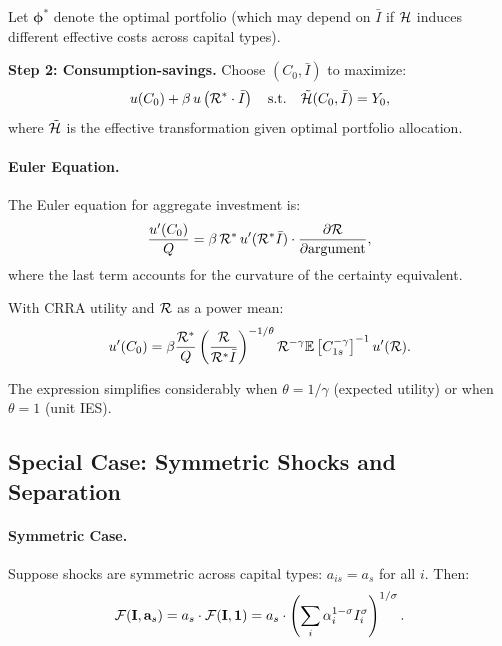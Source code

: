 Let $\boldsymbol{\phi}^*$ denote the optimal portfolio (which may depend on $\bar{I}$ if $\mathcal{H}$ induces different effective costs across capital types).

\medskip
\noindent
\textbf{Step 2: Consumption-savings.} Choose $(C_0, \bar{I})$ to maximize:
\begin{equation}
u(C_0) + \beta \, u\left( \mathcal{R}^* \cdot \bar{I} \right) \quad \text{s.t.} \quad \tilde{\mathcal{H}}(C_0, \bar{I}) = Y_0,
\label{eq:ac-risk-step2}
\end{equation}
where $\tilde{\mathcal{H}}$ is the effective transformation given optimal portfolio allocation.

\paragraph{Euler Equation.}
The Euler equation for aggregate investment is:
\begin{equation}
\frac{u'(C_0)}{Q} = \beta \, \mathcal{R}^* \, u'(\mathcal{R}^* \bar{I}) \cdot \frac{\partial \mathcal{R}}{\partial \text{argument}},
\label{eq:ac-risk-euler-full}
\end{equation}
where the last term accounts for the curvature of the certainty equivalent.

With CRRA utility and $\mathcal{R}$ as a power mean:
\begin{equation}
u'(C_0) = \beta \frac{\mathcal{R}^*}{Q} \left( \frac{\mathcal{R}}{\mathcal{R}^* \bar{I}} \right)^{-1/\theta} \mathcal{R}^{-\gamma} \mathbb{E}\left[ C_{1s}^{-\gamma} \right]^{-1} u'(\mathcal{R}).
\label{eq:ac-risk-euler-crra}
\end{equation}

The expression simplifies considerably when $\theta = 1/\gamma$ (expected utility) or when $\theta = 1$ (unit IES).

\subsection{Special Case: Symmetric Shocks and Separation}
\label{subsec:ac-risk-symmetric}

\paragraph{Symmetric Case.}
Suppose shocks are symmetric across capital types: $a_{is} = a_s$ for all $i$. Then:
\begin{equation}
\mathcal{F}(\mathbf{I}, \mathbf{a}_s) = a_s \cdot \mathcal{F}(\mathbf{I}, \mathbf{1}) = a_s \cdot \left( \sum_{i} \alpha_i^{1-\sigma} I_i^{\sigma} \right)^{1/\sigma}.
\label{eq:ac-risk-symmetric}
\end{equation}

